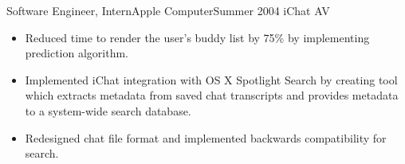 \begin{cvsubsection}{Software Engineer, Intern}{Apple Computer}{Summer 2004}
	iChat AV			
	\begin{itemize}
		\item Reduced time to render the user’s buddy list by 75\% by implementing prediction algorithm.
		\item Implemented iChat integration with OS X Spotlight Search by creating tool which extracts metadata from saved chat transcripts and provides metadata to a system-wide search database.
		\item Redesigned chat file format and implemented backwards compatibility for search.
	\end{itemize}
\end{cvsubsection}